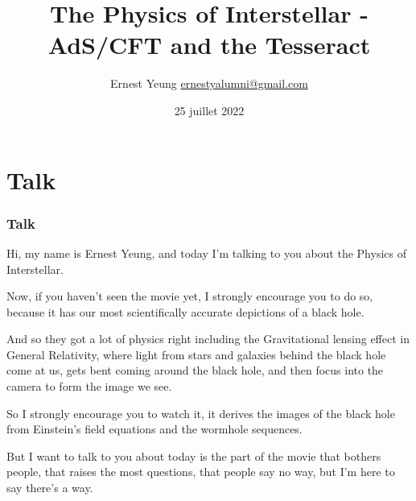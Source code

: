 \documentclass[10pt]{amsart}
\title{The Physics of Interstellar - AdS/CFT and the Tesseract}
\author{Ernest Yeung \href{mailto:ernestyalumni@gmail.com}{ernestyalumni@gmail.com}}
\date{25 juillet 2022}
\begin{document}
	
	
	\maketitle
	
	\begin{multicols*}{2}
		
		\setcounter{tocdepth}{1}
		\tableofcontents
		
		\begin{abstract}
						
		\end{abstract}
		
		\part{}


\end{multicols*}

\part{Talk}

\section{Talk}

Hi, my name is Ernest Yeung, and today I'm talking to you about the Physics of Interstellar.

Now, if you haven't seen the movie yet, I strongly encourage you to do so, because it has our most scientifically accurate depictions of a black hole.

And so they got a lot of physics right including the Gravitational lensing effect in General Relativity, where light from stars and galaxies behind the black hole come at us, gets bent coming around the black hole, and then focus into the camera to form the image we see.

So I strongly encourage you to watch it, it derives the images of the black hole from Einstein's field equations and the wormhole sequences.

But I want to talk to you about today is the part of the movie that bothers people, that raises the most questions, that people say no way, but I'm here to say there's a way.
\end{document}
